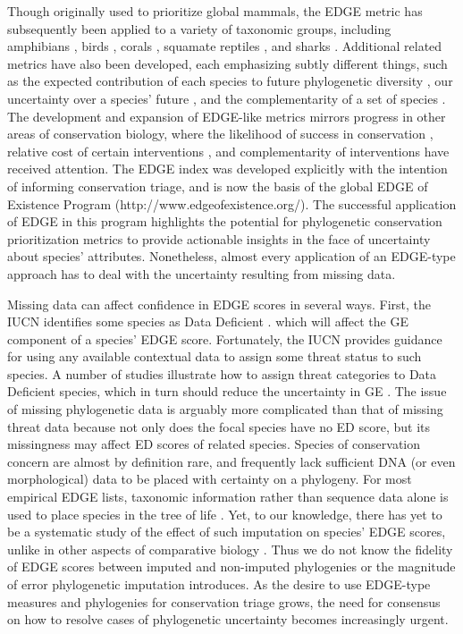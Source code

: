 \documentclass[12pt,english]{article}
\begin{document}
Though originally used to prioritize global mammals, the EDGE metric has
subsequently been applied to a variety of taxonomic groups, including amphibians
\autocite{Isaac2012}, birds \autocite{Jetz2014}, corals \autocite{Curnick2015},
squamate reptiles \autocite{Tonini2016}, and sharks \autocite{Stein2018}.
Additional related metrics have also been developed, each emphasizing subtly
different things, such as the expected contribution of each species to future
phylogenetic diversity \autocite[HEDGE, I-HEDGE;][]{Steel2007,Jensen2016}, our
uncertainty over a species' future \autocite[EDAM;][]{Pearse2015}, and the
complementarity of a set of species \autocite{Faith2008}. The development and
expansion of EDGE-like metrics mirrors progress in other areas of conservation
biology, where the likelihood of success in conservation \autocite{Wilson2007,
Mcbride2007}, relative cost of certain interventions \autocite{Naidoo2006}, and
complementarity of interventions \autocite{Pressey1993, Myers2000} have received
attention. The EDGE index was developed explicitly with the intention of
informing conservation triage, and is now the basis of the global EDGE of
Existence Program (http://www.edgeofexistence.org/). The successful application
of EDGE in this program highlights the potential for phylogenetic conservation
prioritization metrics to provide actionable insights in the face of uncertainty
about species' attributes. Nonetheless, almost every application of an EDGE-type
approach has to deal with the uncertainty resulting from missing data.

Missing data can affect confidence in EDGE scores in several ways. First, the
IUCN identifies some species as Data Deficient \autocite{Iucn2001, Iucn2008}.
which will affect the GE component of a species' EDGE score. Fortunately, the
IUCN provides guidance for using any available contextual data to assign some
threat status to such species. A number of studies illustrate how to assign
threat categories to Data Deficient species, which in turn should reduce the
uncertainty in GE \autocite{Good2006, Butchart2010, Morais2013, Dulvy2014}. The
issue of missing phylogenetic data is arguably more complicated than that of
missing threat data because not only does the focal species have no ED score,
but its missingness may affect ED scores of related species. Species of
conservation concern are almost by definition rare, and frequently lack
sufficient DNA (or even morphological) data to be placed with certainty on a
phylogeny. For most empirical EDGE lists, taxonomic information rather than
sequence data alone is used to place species in the tree of life
\autocite[see][]{Isaac2007, Collen2011, Isaac2012, Jetz2014, Curnick2015,
Stein2018, Gumbs2017}. Yet, to our knowledge, there has yet to be a systematic
study of the effect of such imputation on species' EDGE scores, unlike in other
aspects of comparative biology \autocite{Kuhn2011, Thomas2013, Rabosky2014}.
Thus we do not know the fidelity of EDGE scores between imputed and non-imputed
phylogenies or the magnitude of error phylogenetic imputation introduces. As the
desire to use EDGE-type measures and phylogenies for conservation triage grows,
the need for consensus on how to resolve cases of phylogenetic uncertainty
becomes increasingly urgent.
\end{document}
